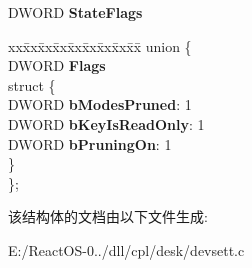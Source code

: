 \begin{DoxyCompactItemize}
D\+W\+O\+RD {\bfseries State\+Flags}
\item 
\mbox{\label{struct___c_dev_settings_abc0ad242320a54052f407322ea34c86b}} 
\begin{tabbing}
xx\=xx\=xx\=xx\=xx\=xx\=xx\=xx\=xx\=\kill
union \{\\
\>DWORD {\bfseries Flags}\\
\mbox{\label{union___c_dev_settings_1_1_0D196_ac64828e42248f0f0c4b55c73dce5fc1a}} 
\>struct \{\\
\>\>DWORD {\bfseries bModesPruned}: 1\\
\>\>DWORD {\bfseries bKeyIsReadOnly}: 1\\
\>\>DWORD {\bfseries bPruningOn}: 1\\
\>\} \\
\}; \\

\end{tabbing}\end{DoxyCompactItemize}


该结构体的文档由以下文件生成\+:\begin{DoxyCompactItemize}
\item 
E\+:/\+React\+O\+S-\/0../dll/cpl/desk/devsett.\+c\end{DoxyCompactItemize}
